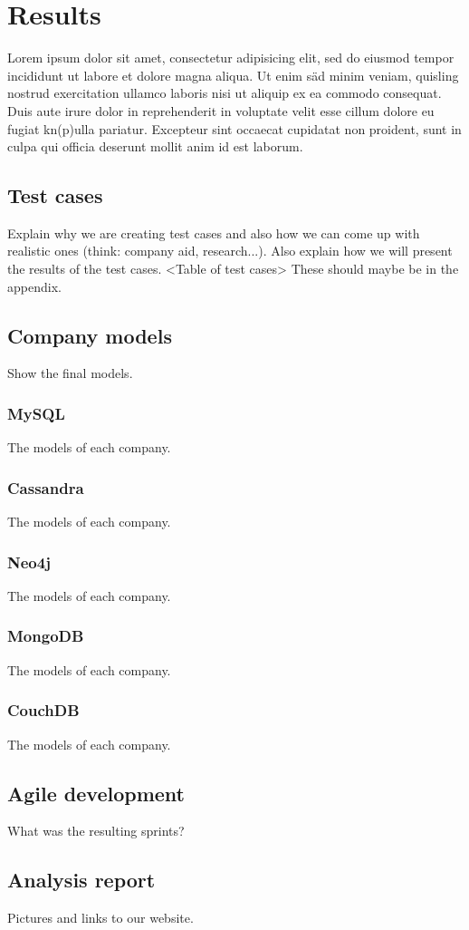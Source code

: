 \chapter{Results}
Lorem ipsum dolor sit amet, consectetur adipisicing elit, sed do eiusmod tempor incididunt ut labore et dolore magna aliqua. Ut enim säd minim veniam, quisling nostrud exercitation ullamco laboris nisi ut aliquip ex ea commodo consequat. Duis aute irure dolor in reprehenderit in voluptate velit esse cillum dolore eu fugiat kn(p)ulla pariatur. Excepteur sint occaecat cupidatat non proident, sunt in culpa qui officia deserunt mollit anim id est laborum.

\section{Test cases}
Explain why we are creating test cases and also how we can come up with realistic ones (think: company aid, research...). Also explain how we will present the results of the test cases.
\newline\newline
<Table of test cases> These should maybe be in the appendix.

\section{Company models}
Show the final models.
\subsection{MySQL}
The models of each company.
\subsection{Cassandra}
The models of each company.
\subsection{Neo4j}
The models of each company.
\subsection{MongoDB}
The models of each company.
\subsection{CouchDB}
The models of each company.

\section{Agile development}
What was the resulting sprints?

\section{Analysis report}
Pictures and links to our website.
